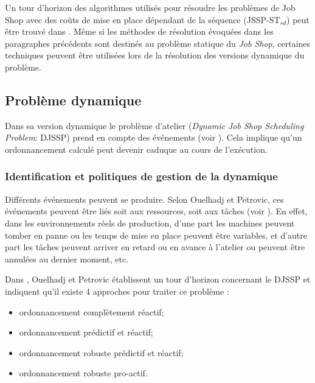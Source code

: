 Un tour d'horizon des algorithmes utilisés pour résoudre les problèmes de Job Shop avec des coûts de mise en place dépendant de la séquence (JSSP-ST$_{sd}$) peut être trouvé dans \cite{Allahverdi2008}. Même si les méthodes de résolution évoquées dans les paragraphes précédents sont destinés au problème statique du \textit{Job Shop}, certaines techniques peuvent être utilisées lors de la résolution des versions dynamique du problème.

\subsection{Problème dynamique}

Dans sa version dynamique le problème d'atelier (\textit{Dynamic Job Shop Scheduling Problem}: DJSSP) prend en compte des événements (voir \cite{Ramasesh1990}). Cela implique qu'un ordonnancement calculé peut devenir caduque au cours de l'exécution.

\subsubsection{Identification et politiques de gestion de la dynamique}
Différents événements peuvent se produire. Selon Ouelhadj et Petrovic, ces événements peuvent être liés soit aux ressources, soit aux tâches (voir \cite{Ouelhadj2009}). En effet, dans les environnements réels de production, d'une part les machines peuvent tomber en panne ou les temps de mise en place peuvent être variables, et d'autre part les tâches peuvent arriver en retard ou en avance à l'atelier ou peuvent être annulées au dernier moment, etc.

Dans \cite{Ouelhadj2009}, Ouelhadj et Petrovic établissent un tour d'horizon concernant le DJSSP et indiquent qu'il existe 4 approches pour traiter ce problème : 
\begin{itemize}
 \item ordonnancement complètement réactif;
 \item ordonnancement prédictif et réactif;
 \item ordonnancement robuste prédictif et réactif;
 \item ordonnancement robuste pro-actif.
\end{itemize}

